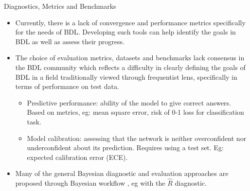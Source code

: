 \documentclass[9pt]{beamer}
\begin{document}
\begin{frame}{Diagnostics, Metrics and Benchmarks}
\begin{itemize}[<+->]
	\item Currently, there is a lack of \alert{convergence} and \alert{performance metrics} specifically for the needs of BDL. Developing such tools can help identify the goals in BDL as well as assess their progress. %
	\item The choice of \alert{evaluation metrics}, \alert{datasets} and \alert{benchmarks} lack consensus in the BDL community which reflects a difficulty in clearly defining the goals of BDL in a field traditionally viewed through frequentist lens, specifically in terms of performance on test data. %
	\begin{itemize}[<+->]
	\item \alert{Predictive performance}: ability of the model to give correct answers. Based on metrics, eg: mean square error, risk of 0-1 loss for classification task.
	\item \alert{Model calibration}: assessing that the network is neither overconfident nor underconfident about its prediction. Requires using a test set. Eg: expected calibration error (ECE).
	\end{itemize}
	\item Many of the general Bayesian diagnostic and evaluation approaches are proposed through Bayesian workflow \citep{gelman2020bayesian}, eg with the $\hat R$ diagnostic. 
%

\end{itemize}
\end{frame}
\end{document}
